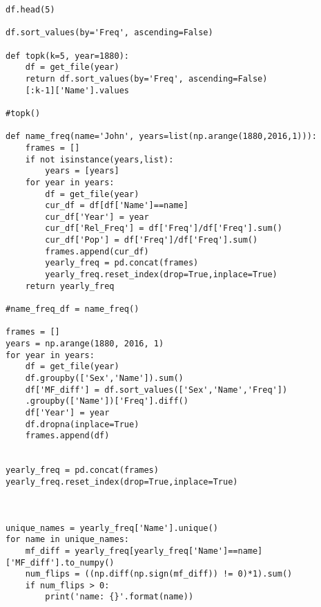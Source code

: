 \documentclass[12pt]{article}%
\begin{document}
\begin{lstlisting}
df.head(5)

df.sort_values(by='Freq', ascending=False)

def topk(k=5, year=1880):
    df = get_file(year)
    return df.sort_values(by='Freq', ascending=False)
    [:k-1]['Name'].values

#topk()

def name_freq(name='John', years=list(np.arange(1880,2016,1))):
    frames = []
    if not isinstance(years,list):
        years = [years]
    for year in years:
        df = get_file(year)
        cur_df = df[df['Name']==name]
        cur_df['Year'] = year
        cur_df['Rel_Freq'] = df['Freq']/df['Freq'].sum()
        cur_df['Pop'] = df['Freq']/df['Freq'].sum()
        frames.append(cur_df)
        yearly_freq = pd.concat(frames)
        yearly_freq.reset_index(drop=True,inplace=True)
    return yearly_freq

#name_freq_df = name_freq()

frames = []
years = np.arange(1880, 2016, 1)
for year in years:
    df = get_file(year)
    df.groupby(['Sex','Name']).sum()
    df['MF_diff'] = df.sort_values(['Sex','Name','Freq'])
    .groupby(['Name'])['Freq'].diff()
    df['Year'] = year
    df.dropna(inplace=True)
    frames.append(df)
    
    
yearly_freq = pd.concat(frames)
yearly_freq.reset_index(drop=True,inplace=True)



unique_names = yearly_freq['Name'].unique()
for name in unique_names:
    mf_diff = yearly_freq[yearly_freq['Name']==name]['MF_diff'].to_numpy()
    num_flips = ((np.diff(np.sign(mf_diff)) != 0)*1).sum()
    if num_flips > 0:
        print('name: {}'.format(name))
\end{lstlisting}
\end{document}
